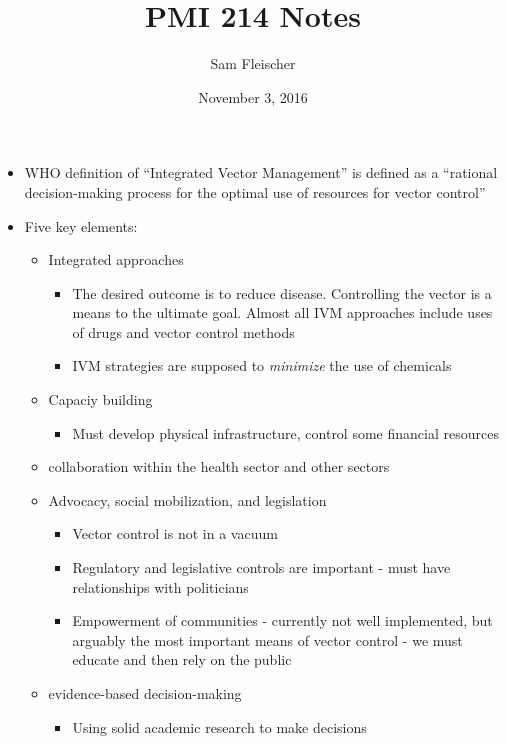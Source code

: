 \documentclass{article}
\title{PMI 214 Notes}
\author{Sam Fleischer}
\date{November 3, 2016}
\begin{document}
    \maketitle

    \begin{itemize}
        \item WHO definition of ``Integrated Vector Management'' is defined as a ``rational decision-making process for the optimal use of resources for vector control''
        \item Five key elements:
        \begin{itemize}
            \item Integrated approaches
            \begin{itemize}
                \item The desired outcome is to reduce disease.  Controlling the vector is a means to the ultimate goal.  Almost all IVM approaches include uses of drugs and vector control methods
                \item IVM strategies are supposed to \emph{minimize} the use of chemicals
            \end{itemize}
            \item Capaciy building
            \begin{itemize}
                \item Must develop physical infrastructure, control some financial resources
            \end{itemize}
            \item collaboration within the health sector and other sectors
            \item Advocacy, social mobilization, and legislation
            \begin{itemize}
                \item Vector control is not in a vacuum
                \item Regulatory and legislative controls are important - must have relationships with politicians
                \item Empowerment of communities - currently not well implemented, but arguably the most important means of vector control - we must educate and then rely on the public
            \end{itemize}
            \item evidence-based decision-making
            \begin{itemize}
                \item Using solid academic research to make decisions

\end{itemize}
\end{itemize}
\end{itemize}
\end{document}
